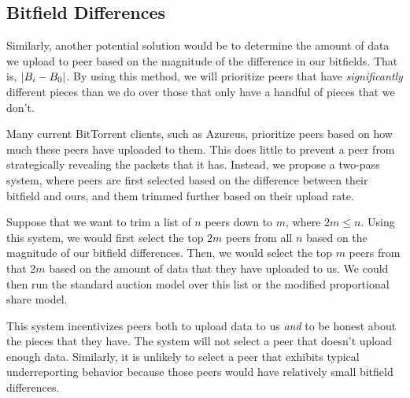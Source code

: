 \subsection{Bitfield Differences}

Similarly, another potential solution would be to determine the amount of data we upload to peer based on the magnitude of the difference in our bitfields. That is, $\lvert B_i - B_0\rvert$. By using this method, we will prioritize peers that have \emph{significantly} different pieces than we do over those that only have a handful of pieces that we don't.

Many current BitTorrent clients, such as Azureus, prioritize peers based on how much these peers have uploaded to them. This does little to prevent a peer from strategically revealing the packets that it has. Instead, we propose a two-pass system, where peers are first selected based on the difference between their bitfield and ours, and them trimmed further based on their upload rate.

Suppose that we want to trim a list of $n$ peers down to $m$, where $2m \leq n$. Using this system, we would first select the top $2m$ peers from all $n$ based on the magnitude of our bitfield differences. Then, we would select the top $m$ peers from that $2m$ based on the amount of data that they have uploaded to us. We could then run the standard auction model over this list or the modified proportional share model.

This system incentivizes peers both to upload data to us \emph{and} to be honest about the pieces that they have. The system will not select a peer that doesn't upload enough data. Similarly, it is unlikely to select a peer that exhibits typical underreporting behavior because those peers would have relatively small bitfield differences.
